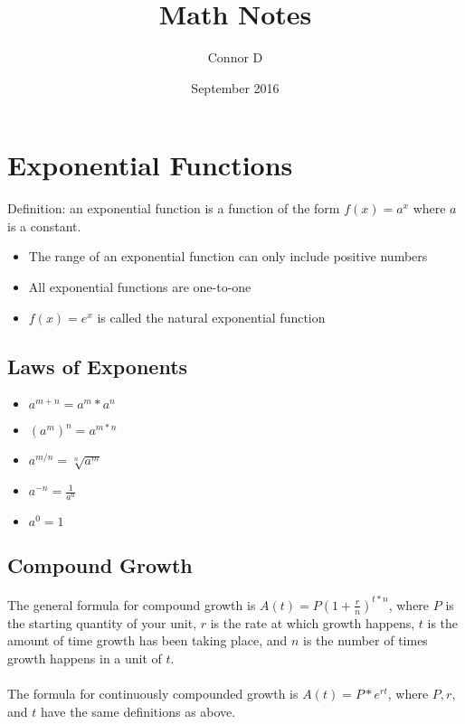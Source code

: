 \documentclass[fleqn]{article}
\title{Math Notes}
\author{Connor D}
\date{September 2016}
\begin{document}
\maketitle

\section{Exponential Functions}
Definition: an exponential function is a function of the form \(f(x) = a^x\) where \(a\) is a constant.
\begin{itemize}
    \item The range of an exponential function can only include positive numbers
    \item All exponential functions are one-to-one
    \item \(f(x) = e^x\) is called the natural exponential function
\end{itemize}

\subsection{Laws of Exponents}
\begin{itemize}
    \item \(a^{m+n} = a^m * a^n\)
    \item \((a^m)^n = a^{m*n}\)
    \item \(a^{m/n} = \sqrt[n]{a^m}\)
    \item \(a^{-n} = \frac{1}{a^n}\)
    \item \(a^0 = 1\)
\end{itemize}

\subsection{Compound Growth}
The general formula for compound growth is \(A(t) = P(1+\frac{r}{n})^{t*n}\), where \(P\) is the starting quantity of your unit, \(r\) is the rate at which growth happens, \(t\) is the amount of time growth has been taking place, and \(n\) is the number of times growth happens in a unit of \(t\).\\
\\
The formula for continuously compounded growth is \(A(t) = P*e^{rt}\), where \(P, r,\) and \(t\) have the same definitions as above.
\end{document}
